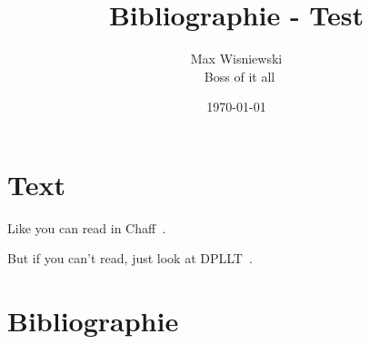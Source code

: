 \documentclass[ngerman,a4paper,11pt]{article}
\title{Bibliographie - Test}
\author{Max Wisniewski\\~Boss of it all}
\date{\today}
\begin{document}
\maketitle

\section{Text}

Like you can read in Chaff~\cite{smt:chaff:2001}.

But if you can't read, just look at DPLLT~\cite{smt:dpllt:2004}.

\section{Bibliographie}



\end{document}
